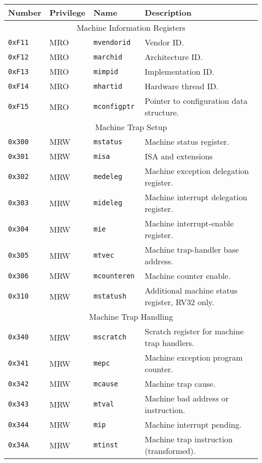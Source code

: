 \begin{table}[htb!]
\begin{center}
\begin{tabular}{|l|l|l|l|}
\hline
Number    & Privilege & Name & Description \\
\hline
\multicolumn{4}{|c|}{Machine Information Registers} \\
\hline
\tt 0xF11 & MRO &\tt mvendorid   & Vendor ID. \\
\tt 0xF12 & MRO &\tt marchid     & Architecture ID. \\
\tt 0xF13 & MRO &\tt mimpid      & Implementation ID. \\
\tt 0xF14 & MRO &\tt mhartid     & Hardware thread ID. \\
\tt 0xF15 & MRO &\tt mconfigptr  & Pointer to configuration data structure. \\
\hline
\multicolumn{4}{|c|}{Machine Trap Setup} \\
\hline
\tt 0x300 & MRW  &\tt mstatus    & Machine status register. \\
\tt 0x301 & MRW  &\tt misa       & ISA and extensions \\
\tt 0x302 & MRW  &\tt medeleg    & Machine exception delegation register. \\
\tt 0x303 & MRW  &\tt mideleg    & Machine interrupt delegation register. \\
\tt 0x304 & MRW  &\tt mie        & Machine interrupt-enable register. \\
\tt 0x305 & MRW  &\tt mtvec      & Machine trap-handler base address. \\
\tt 0x306 & MRW  &\tt mcounteren & Machine counter enable. \\
\tt 0x310 & MRW  &\tt mstatush   & Additional machine status register, RV32 only. \\
\hline
\multicolumn{4}{|c|}{Machine Trap Handling} \\
\hline
\tt 0x340 & MRW  &\tt mscratch   & Scratch register for machine trap handlers. \\
\tt 0x341 & MRW  &\tt mepc       & Machine exception program counter. \\
\tt 0x342 & MRW  &\tt mcause     & Machine trap cause. \\
\tt 0x343 & MRW  &\tt mtval      & Machine bad address or instruction. \\
\tt 0x344 & MRW  &\tt mip        & Machine interrupt pending. \\
\tt 0x34A & MRW  &\tt mtinst     & Machine trap instruction (transformed). \\

\end{tabular}
\end{center}
\end{table}
